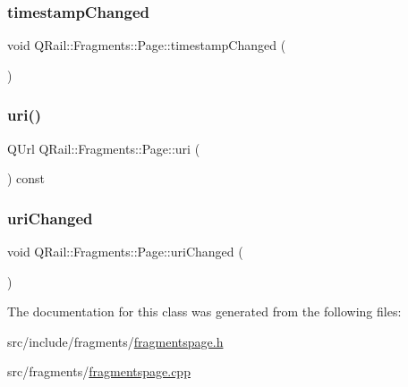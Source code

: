 \subsubsection{\texorpdfstring{timestampChanged}{timestampChanged}}
{\footnotesize\ttfamily void Q\+Rail\+::\+Fragments\+::\+Page\+::timestamp\+Changed (\begin{DoxyParamCaption}{ }\end{DoxyParamCaption})\hspace{0.3cm}{\ttfamily [signal]}}

\mbox{\label{classQRail_1_1Fragments_1_1Page_a55b83d498119763fb6218ccb0959967e}} 
\subsubsection{\texorpdfstring{uri()}{uri()}}
{\footnotesize\ttfamily Q\+Url Q\+Rail\+::\+Fragments\+::\+Page\+::uri (\begin{DoxyParamCaption}{ }\end{DoxyParamCaption}) const}

\mbox{\label{classQRail_1_1Fragments_1_1Page_a87f9b4f40af2e858ea3e046a2107631e}} 
\subsubsection{\texorpdfstring{uriChanged}{uriChanged}}
{\footnotesize\ttfamily void Q\+Rail\+::\+Fragments\+::\+Page\+::uri\+Changed (\begin{DoxyParamCaption}{ }\end{DoxyParamCaption})\hspace{0.3cm}{\ttfamily [signal]}}



The documentation for this class was generated from the following files\+:\begin{DoxyCompactItemize}
\item 
src/include/fragments/\mbox{\hyperlink{fragmentspage_8h}{fragmentspage.\+h}}\item 
src/fragments/\mbox{\hyperlink{fragmentspage_8cpp}{fragmentspage.\+cpp}}\end{DoxyCompactItemize}
